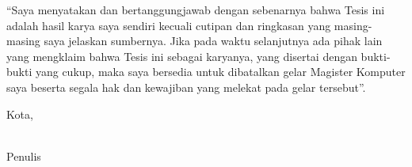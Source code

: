 \noindent
``Saya menyatakan dan bertanggungjawab dengan sebenarnya bahwa Tesis ini adalah hasil karya saya sendiri kecuali cutipan dan ringkasan yang masing-masing saya jelaskan sumbernya. Jika pada waktu selanjutnya ada pihak lain yang mengklaim bahwa Tesis ini sebagai karyanya, yang disertai dengan bukti-bukti yang cukup, maka saya bersedia untuk dibatalkan gelar Magister Komputer saya beserta segala hak dan kewajiban yang melekat pada gelar tersebut''.

\vspace{1.5cm}


\begin{center}
{Kota}, \makebox[4cm]{\dotfill}  %

\vspace{0.5cm}


\vspace{0.5cm}

\underline{\textbf{\AuthorName}}\\
Penulis

\end{center}
